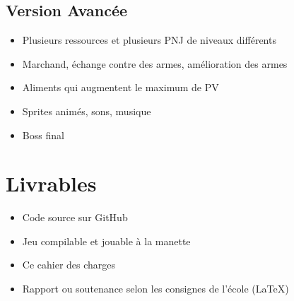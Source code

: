 \documentclass[11pt,a4paper]{article}
\begin{document}

\subsection*{Version Avancée}
\begin{itemize}
    \item Plusieurs ressources et plusieurs PNJ de niveaux différents
    \item Marchand, échange contre des armes, amélioration des armes
    \item Aliments qui augmentent le maximum de PV
    \item Sprites animés, sons, musique
    \item Boss final
\end{itemize}



\section{Livrables}

\begin{itemize}
    \item Code source sur GitHub
    \item Jeu compilable et jouable à la manette
    \item Ce cahier des charges
    \item Rapport ou soutenance selon les consignes de l'école (LaTeX)
\end{itemize}
\end{document}
